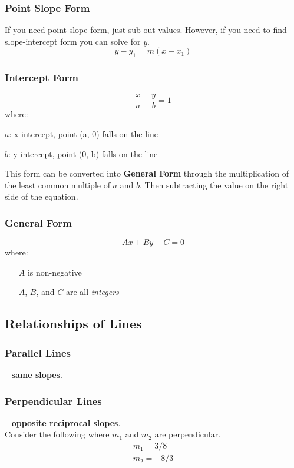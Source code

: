 \documentclass[twocolumn]{article}
\newenvironment{adescription}[1]
{\begin{list}{}%
	{\renewcommand\makelabel[1]{##1\hfill}%
		\settowidth\labelwidth{\makelabel{#1}}%
		\setlength\leftmargin{\labelwidth}
		\addtolength\leftmargin{\labelsep}}}
{\end{list}}
\newcommand{\bd}{\textbf}
\newcommand{\dquad}{\quad{}\quad{}}
\begin{document}
	    \subsubsection{Point Slope Form}
	    	If you need point-slope form, just sub out values. However, if you need to find slope-intercept form you can solve for $y$.
	    	\begin{equation*}
	    		y - y_1 = m(x - x_1)
	    	\end{equation*}
	    \subsubsection{Intercept Form}
	    	\begin{equation*}
	    		\frac{x}{a} + \frac{y}{b} = 1
	    	\end{equation*}
    		where:
    		\begin{adescription}{\dquad{}$b$:}
    			\item[\dquad{}$a$:] x-intercept, point (a, 0) falls on the line
    			\item[\dquad{}$b$:] y-intercept, point (0, b) falls on the line
    		\end{adescription}
    		This form can be converted into \bd{General Form} through the multiplication of the least common multiple of $a$ and $b$. Then subtracting   the value on the right side of the equation.
	    \subsubsection{General Form}
	    	\begin{equation*}
	    		Ax + By + C = 0
	    	\end{equation*}
    		where:
    		\begin{itemize}[label=--]
    			\item[] $A$ is non-negative
    			\item[] $A$, $B$, and $C$ are all \emph{integers}
    		\end{itemize}
	  \subsection{Relationships of Lines}
	    \subsubsection{Parallel Lines}
	    	-- \bd{same slopes}.
	    \subsubsection{Perpendicular Lines}
	    	-- \bd{opposite reciprocal slopes}. \\
	    	Consider the following where $m_1$ and $m_2$ are perpendicular.
	    	\begin{align*}
	    		m_1 = 3/8 \\
	    		m_2 = -8/3
	    	\end{align*}
    
\end{document}
